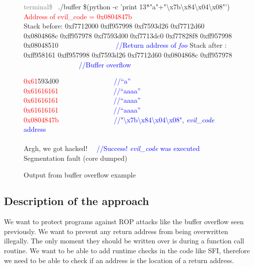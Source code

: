 \documentclass[11pt]{sdm}
\begin{document}
\begin{figure}[!ht]
\textcolor{gray}{terminal\$~} ./buffer \$(python -c 'print 13*"a"+"\textbackslash{x7b}\textbackslash{x84}\textbackslash{x04}\textbackslash{x08}"') \\
\textcolor{red}{Address of evil\_code = 0x0804847b} \\
Stack before: \hfill \break
0xf7712000    \hfill \break
0xff957998    \hfill \break
0xf7593d26    \hfill \break
0xf7712d60    \hfill \break
0x0804868c    \hfill \break
0xff957978    \hfill \break
0xf7593d00    \hfill \break
0xf7713dc0    \hfill \break
0xf77828f8    \hfill \break
0xff957998    \hfill \break
0x08048510    ~~~~~~~~~~~~~~~~\textcolor{blue}{//Return address of \textit{foo}}\hfill \break
              \hfill \break
Stack after : \hfill \break
0xff958161    \hfill \break
0xff957998    \hfill \break
0xf7593d26    \hfill \break
0xf7712d60    \hfill \break
0x0804868c    \hfill \break
0xff957978   			   ~~~~~~~~~~~~~~~~\textcolor{blue}{//Buffer overflow}\hfill \break

\textcolor{red}{0x61}593d00~~~~~~~~~~~~~~~~\textcolor{blue}{//``a''   } \hfill \break
\textcolor{red}{0x61616161}~~~~~~~~~~~~~~~~\textcolor{blue}{//``aaaa''} \hfill \break
\textcolor{red}{0x61616161}~~~~~~~~~~~~~~~~\textcolor{blue}{//``aaaa''} \hfill \break
\textcolor{red}{0x61616161}~~~~~~~~~~~~~~~~\textcolor{blue}{//``aaaa''} \hfill \break
\textcolor{red}{0x0804847b}~~~~~~~~~~~~~~~~\textcolor{blue}{//"\textbackslash{x7b}\textbackslash{x84}\textbackslash{x04}\textbackslash{x08}",  \textit{evil\_code} address \\}
\\
Argh, we got hacked! ~~\textcolor{blue}{//Success! \textit{evil\_code} was executed}\\
Segmentation fault (core dumped)
\caption{Output from buffer overflow example}
\label{output_buffer}
\end{figure}


\subsection{Description of the approach}
\label{sub:Description of the approach}
	We want to protect programs against ROP attacks like the buffer overflow seen previously. We want to prevent any return address from being overwritten illegally. The only moment they should be written over is during a function call routine.
We want to be able to add runtime checks in the code like SFI, therefore we need to be able to check if an address is the location of a return address. 
\end{document}
